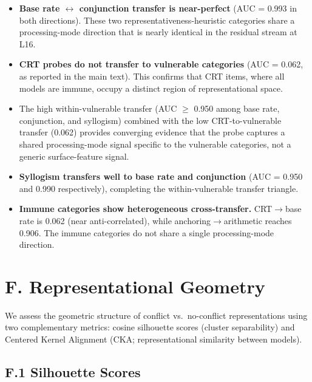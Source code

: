 \documentclass[accepted]{article}
\begin{document}
\begin{itemize}[leftmargin=*,itemsep=4pt]
  \item \textbf{Base rate $\leftrightarrow$ conjunction transfer is
  near-perfect} (AUC = 0.993 in both directions).  These two
  representativeness-heuristic categories share a processing-mode
  direction that is nearly identical in the residual stream at L16.

  \item \textbf{CRT probes do not transfer to vulnerable categories}
  (AUC = 0.062, as reported in the main text).  This confirms that
  CRT items, where all models are immune, occupy a distinct region of
  representational space.

  \item The high within-vulnerable transfer (AUC $\geq$ 0.950 among
  base rate, conjunction, and syllogism) combined with the low
  CRT-to-vulnerable transfer (0.062) provides converging evidence
  that the probe captures a shared processing-mode signal specific to
  the vulnerable categories, not a generic surface-feature signal.

  \item \textbf{Syllogism transfers well to base rate and conjunction}
  (AUC = 0.950 and 0.990 respectively), completing the
  within-vulnerable transfer triangle.

  \item \textbf{Immune categories show heterogeneous cross-transfer.}
  CRT$\to$base rate is 0.062 (near anti-correlated), while
  anchoring$\to$arithmetic reaches 0.906.  The immune categories do
  not share a single processing-mode direction.
\end{itemize}


\section*{F. Representational Geometry}
\label{sec:appendix_geometry}

We assess the geometric structure of conflict vs.\ no-conflict
representations using two complementary metrics: cosine silhouette
scores (cluster separability) and Centered Kernel Alignment (CKA;
representational similarity between models).

\subsection*{F.1 Silhouette Scores}
\end{document}
